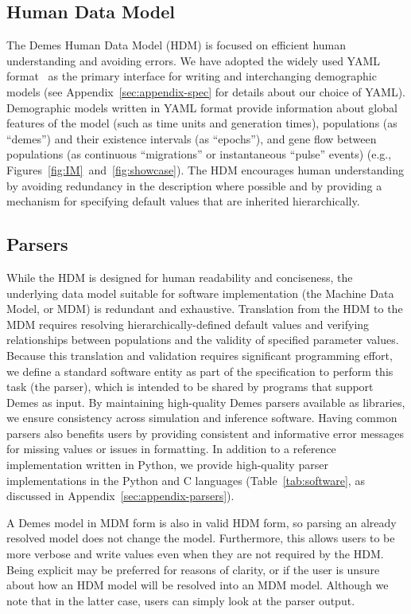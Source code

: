 \documentclass[11pt]{article}
\begin{document}
\subsection*{Human Data Model}

The Demes Human Data Model (HDM) is focused on efficient human
understanding and avoiding errors.
We have adopted the widely used YAML format~\citep{ben2009yaml} as the
primary interface for writing and interchanging demographic models
(see Appendix~\ref{sec:appendix-spec} for details about our choice of
YAML).
Demographic models written in YAML format provide information about global
features of the model (such as time units and generation times),
populations (as ``demes'') and their existence intervals (as ``epochs''),
and gene flow between populations
(as continuous ``migrations'' or instantaneous ``pulse'' events)
(e.g., Figures~\ref{fig:IM}~and~\ref{fig:showcase}).
The HDM encourages human understanding by avoiding
redundancy in the description where possible and by providing a mechanism for
specifying default values that are inherited hierarchically.


\subsection*{Parsers}

While the HDM is designed for human readability and
conciseness, the underlying data model suitable for software implementation
(the Machine Data Model, or MDM)
is redundant and exhaustive.
Translation from the HDM to the MDM
requires resolving hierarchically-defined default values and verifying
relationships between populations and the validity of specified parameter
values.
Because this translation and validation requires significant
programming effort, we define a standard software entity as part of the
specification to perform this task (the parser),
which is intended to be shared by programs that support Demes as input.
By maintaining high-quality Demes parsers available as libraries,
we ensure consistency across simulation and inference
software.
Having common parsers also benefits users by providing
consistent and informative error messages for missing values or
issues in formatting.
In addition to a reference implementation written in Python,
we provide high-quality parser implementations in the Python and
C languages (Table~\ref{tab:software}, as discussed in
Appendix~\ref{sec:appendix-parsers}).

A Demes model in MDM form is also in valid HDM form, so parsing an already
resolved model does not change the model. Furthermore, this allows users to be
more verbose and write values even when they are not required by the HDM.
Being explicit may be preferred for reasons of clarity, or if the user is
unsure about how an HDM model will be resolved into an MDM model.
Although we note that in the latter case, users can simply look at the
parser output.
\end{document}
